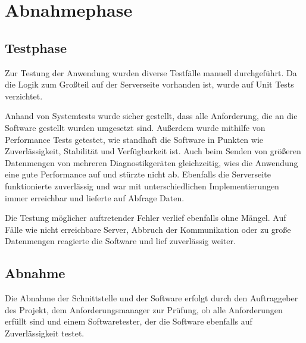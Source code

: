 \section{Abnahmephase}
\label{sec:Abnahmephase}

\subsection{Testphase}
\label{sec:Testphase}
Zur Testung der Anwendung wurden diverse Testfälle manuell durchgeführt. Da die Logik zum Großteil auf der Serverseite vorhanden ist, wurde auf Unit Tests verzichtet.

Anhand von Systemtests wurde sicher gestellt, dass alle Anforderung, die an die Software gestellt wurden umgesetzt sind. Außerdem wurde mithilfe von Performance Tests getestet, wie standhaft die Software in Punkten wie Zuverlässigkeit, Stabilität und Verfügbarkeit ist. Auch beim Senden von größeren Datenmengen von mehreren Diagnostikgeräten gleichzeitig, wies die Anwendung eine gute Performance auf und stürzte nicht ab. Ebenfalls die Serverseite funktionierte zuverlässig und war mit unterschiedlichen  Implementierungen immer erreichbar und lieferte auf Abfrage Daten.

Die Testung möglicher auftretender Fehler verlief ebenfalls ohne Mängel. Auf Fälle wie nicht erreichbare Server, Abbruch der Kommunikation oder zu große Datenmengen reagierte die Software und lief zuverlässig weiter.

\subsection{Abnahme}
\label{sec:Abnahme}
Die Abnahme der Schnittstelle und der Software erfolgt durch den Auftraggeber des Projekt, dem Anforderungsmanager zur Prüfung, ob alle Anforderungen erfüllt sind und einem Softwaretester, der die Software ebenfalls auf Zuverlässigkeit testet.